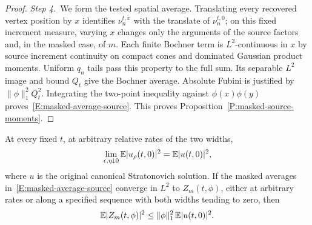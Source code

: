 \begin{proof}
  \medskip
  \noindent\textit{Step 4.~}We form the tested spatial average.
  Translating every recovered vertex position by $x$ identifies $\nu_n^{t,x}$
  with the translate of $\nu_n^{t,0}$; on this fixed increment measure,
  varying $x$ changes only the arguments of the source factors and, in the
  masked case, of $m$.
  Each finite Bochner term is $L^2$-continuous in $x$ by source increment
  continuity on compact cones and dominated Gaussian product moments. Uniform
  $q_n$ tails pass this property to the full sum. Its separable $L^2$ image and
  bound $Q_t$ give the Bochner average. Absolute Fubini is justified by
  $\|\phi\|_1^2Q_t^2$. Integrating the two-point inequality against
  $\phi(x)\phi(y)$ proves~\eqref{E:masked-average-source}. This proves
  Proposition~\ref{P:masked-source-moments}.
\end{proof}

\begin{proposition}
  \label{P:masked-canonical-transfer}
  At every fixed $t$, at arbitrary relative rates of the two widths,
  \begin{equation}\label{E:masked-unmasked-moment-limit}
    \lim_{\epsilon,\eta\downarrow0}\mathbb{E}|u_\rho(t,0)|^2
    =\mathbb{E}|u(t,0)|^2,
  \end{equation}
  where $u$ is the original canonical Stratonovich solution. If the masked
  averages in~\eqref{E:masked-average-source} converge in $L^2$ to
  $Z_m(t,\phi)$, either at arbitrary rates or along a specified sequence with
  both widths tending to zero, then
  \begin{equation}\label{E:masked-conditional-transfer}
    \mathbb{E}|Z_m(t,\phi)|^2\le\|\phi\|_1^2\,\mathbb{E}|u(t,0)|^2.
  \end{equation}
\end{proposition}

